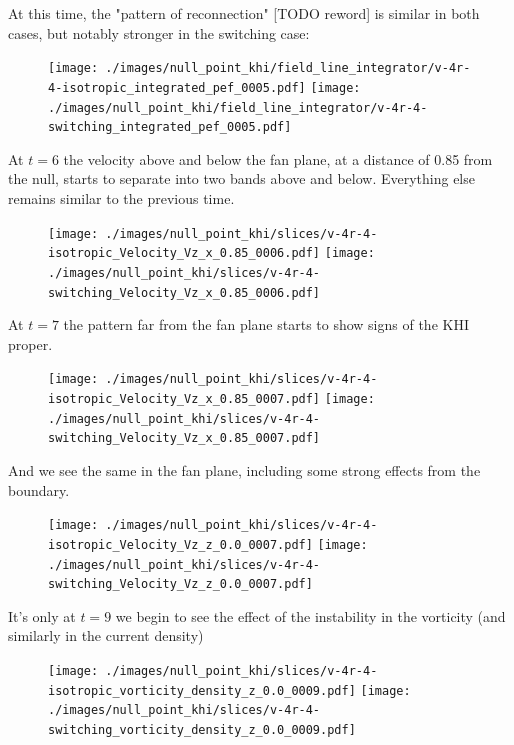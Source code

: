 At this time, the "pattern of reconnection" [TODO reword] is similar in both cases, but notably stronger in the switching case:

\begin{figure}[H]
  \centering
  \texttt{[image: ./images/null\_point\_khi/field\_line\_integrator/v-4r-4-isotropic\_integrated\_pef\_0005.pdf]}
  \texttt{[image: ./images/null\_point\_khi/field\_line\_integrator/v-4r-4-switching\_integrated\_pef\_0005.pdf]}
\end{figure}

At $t=6$ the velocity above and below the fan plane, at a distance of 0.85 from the null, starts to separate into two bands above and below. Everything else remains similar to the previous time.

\begin{figure}[H]
  \centering
  \texttt{[image: ./images/null\_point\_khi/slices/v-4r-4-isotropic\_Velocity\_Vz\_x\_0.85\_0006.pdf]}
  \texttt{[image: ./images/null\_point\_khi/slices/v-4r-4-switching\_Velocity\_Vz\_x\_0.85\_0006.pdf]}
\end{figure}

At $t=7$ the pattern far from the fan plane starts to show signs of the KHI proper.

\begin{figure}[H]
  \centering
  \texttt{[image: ./images/null\_point\_khi/slices/v-4r-4-isotropic\_Velocity\_Vz\_x\_0.85\_0007.pdf]}
  \texttt{[image: ./images/null\_point\_khi/slices/v-4r-4-switching\_Velocity\_Vz\_x\_0.85\_0007.pdf]}
\end{figure}

And we see the same in the fan plane, including some strong effects from the boundary.

\begin{figure}[H]
  \centering
  \texttt{[image: ./images/null\_point\_khi/slices/v-4r-4-isotropic\_Velocity\_Vz\_z\_0.0\_0007.pdf]}
  \texttt{[image: ./images/null\_point\_khi/slices/v-4r-4-switching\_Velocity\_Vz\_z\_0.0\_0007.pdf]}
\end{figure}

It's only at $t=9$ we begin to see the effect of the instability in the vorticity (and similarly in the current density)

\begin{figure}[H]
  \centering
  \texttt{[image: ./images/null\_point\_khi/slices/v-4r-4-isotropic\_vorticity\_density\_z\_0.0\_0009.pdf]}
  \texttt{[image: ./images/null\_point\_khi/slices/v-4r-4-switching\_vorticity\_density\_z\_0.0\_0009.pdf]}
\end{figure}

